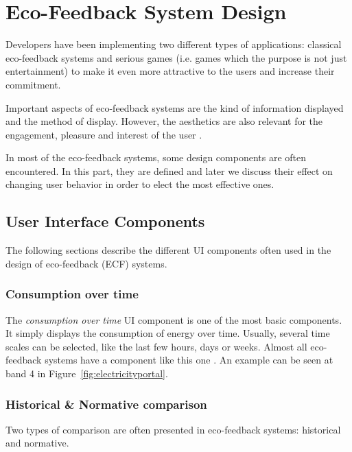 \documentclass[journal]{vgtc}                %
\begin{document}
\section{Eco-Feedback System Design}
Developers have been implementing two different types of applications: classical eco-feedback systems and serious games (i.e. games which the purpose is not just entertainment) to make it even more attractive to the users and increase their commitment.

Important aspects of eco-feedback systems are the kind of information displayed and the method of display. However, the aesthetics are also relevant for the engagement, pleasure and interest of the user \cite{bartram2015design}.

In most of the eco-feedback systems, some design components are often encountered.
In this part, they are defined and later we discuss their effect on changing user behavior in order to elect the most effective ones. 

\clearpage
\subsection{User Interface Components}
The following sections describe the different UI components often used in the design of eco-feedback (ECF) systems.
\subsubsection{Consumption over time}
The \textit{consumption over time} UI component is one of the most basic components. It simply displays the consumption of energy over time. Usually, several time scales can be selected, like the last few hours, days or weeks.
Almost all eco-feedback systems have a component like this one \cite{spagnolli2011eco}. 
An example can be seen at band 4 in Figure~\ref{fig:electricityportal}.

\subsubsection{Historical \& Normative comparison}
Two types of comparison are often presented in eco-feedback systems: historical and normative.\\
\end{document}

